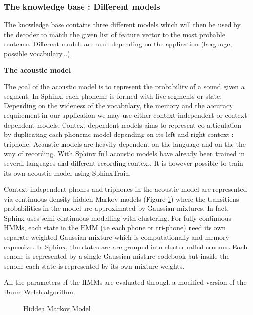 \subsubsection*{The knowledge base : Different models}
The knowledge base contains three different models which will then be used by the decoder to match the given list of feature vector to the most probable sentence. Different models are used depending on the application (language, possible vocabulary...).  

\textbf{The acoustic model}

The goal of the acoustic model is to represent the probability of a sound given a segment. In Sphinx, each phoneme is formed with five segments or state. Depending on the wideness of the vocabulary, the memory and the accuracy requirement in our application we may use either context-independent or context-dependent models. Context-dependent models aims to represent co-articulation  by duplicating each phoneme model depending on its left and right context : triphone. Acoustic models are heavily dependent on the language and on the the way of recording. With Sphinx full acoustic models have already been trained in several languages and different recording context. It is however possible to train its own acoustic model using SphinxTrain. 

Context-independent phones and triphones in the acoustic model are represented via continuous density hidden Markov models (Figure \ref{fig:HMM}) where the transitions probabilities in the model are approximated by Gaussian mixtures. In fact, Sphinx uses semi-continuous modelling with clustering. For fully continuous HMMs, each state in the HMM (i.e each phone or tri-phone) need its own separate weighted Gaussian mixture which is computationally and memory expensive. In Sphinx, the states are are grouped into cluster called senones. Each senone is represented by a single Gaussian misture codebook but inside the senone each state is represented by its own mixture weights. 

All the parameters of the HMMs are evaluated through a modified version of the Baum-Welch algorithm. 


\begin{figure}[h!]
\caption{Hidden Markov Model}
\label{fig:HMM}
\end{figure}

